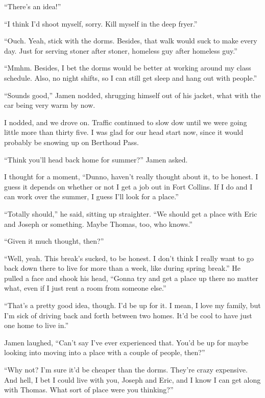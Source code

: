 ``There's an idea!''

``I think I'd shoot myself, sorry.  Kill myself in the deep fryer.''

``Ouch.  Yeah, stick with the dorms.  Besides, that walk would suck to make every day.  Just for serving stoner after stoner, homeless guy after homeless guy.''

``Mmhm.  Besides, I bet the dorms would be better at working around my class schedule.  Also, no night shifts, so I can still get sleep and hang out with people.''

``Sounds good,'' Jamen nodded, shrugging himself out of his jacket, what with the car being very warm by now.

I nodded, and we drove on.  Traffic continued to slow dow until we were going little more than thirty five.  I was glad for our head start now, since it would probably be snowing up on Berthoud Pass.

``Think you'll head back home for summer?'' Jamen asked.

I thought for a moment, ``Dunno, haven't really thought about it, to be honest.  I guess it depends on whether or not I get a job out in Fort Collins.  If I do and I can work over the summer, I guess I'll look for a place.''

``Totally should,'' he said, sitting up straighter.  ``We should get a place with Eric and Joseph or something.  Maybe Thomas, too, who knows.''

``Given it much thought, then?''

``Well, yeah.  This break's sucked, to be honest.  I don't think I really want to go back down there to live for more than a week, like during spring break.''  He pulled a face and shook his head, ``Gonna try and get a place up there no matter what, even if I just rent a room from someone else.''

``That's a pretty good idea, though.  I'd be up for it.  I mean, I love my family, but I'm sick of driving back and forth between two homes.  It'd be cool to have just one home to live in.''

Jamen laughed, ``Can't say I've ever experienced that.  You'd be up for maybe looking into moving into a place with a couple of people, then?''

``Why not?  I'm sure it'd be cheaper than the dorms.  They're crazy expensive.  And hell, I bet I could live with you, Joseph and Eric, and I know I can get along with Thomas.  What sort of place were you thinking?''

